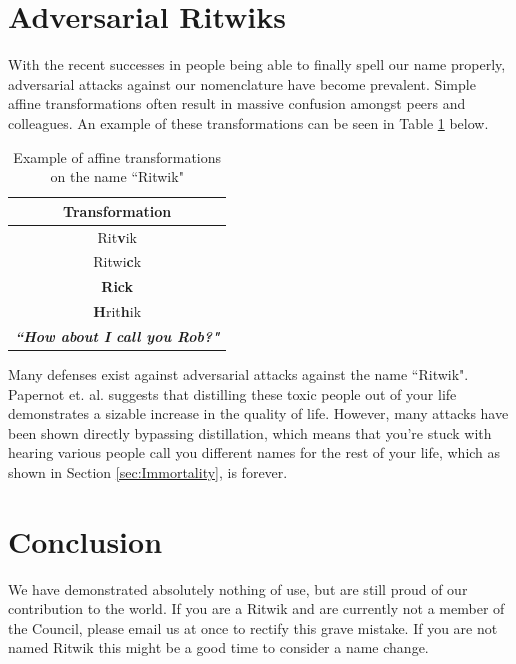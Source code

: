 \documentclass[]{article}
\begin{document}
\section{Adversarial Ritwiks}
With the recent successes in people being able to finally spell our name properly, adversarial attacks against our nomenclature have become prevalent. Simple affine transformations often result in massive confusion amongst peers and colleagues. An example of these transformations can be seen in Table \ref{table:affineadversarial} below.
\begin{table}[h]
\centering
\begin{tabular}{|c|}
	\hline 
	\textbf{Transformation}\\ 
	\hline 
	Rit\textbf{v}ik\\ 
	\hline 
	Ritwi\textbf{c}k\\
	\hline
	\textbf{Rick}\\
	\hline
	\textbf{H}rit\textbf{h}ik\\
	\hline
	\textbf{\textit{``How about I call you Rob?"}}\\
	\hline
\end{tabular}
\caption{Example of affine transformations on the name ``Ritwik"}
\label{table:affineadversarial}
\end{table}
Many defenses exist against adversarial attacks against the name ``Ritwik". Papernot et. al. \cite{Papernot} suggests that distilling these toxic people out of your life demonstrates a sizable increase in the quality of life. However, many attacks have been shown directly bypassing distillation, which means that you're stuck with hearing various people call you different names for the rest of your life, which as shown in Section \ref{sec:Immortality}, is forever.

\section{Conclusion}
We have demonstrated absolutely nothing of use, but are still proud of our contribution to the world. If you are a Ritwik and are currently not a member of the Council, please email us at once to rectify this grave mistake. If you are not named Ritwik this might be a good time to consider a name change. 



\end{document}
